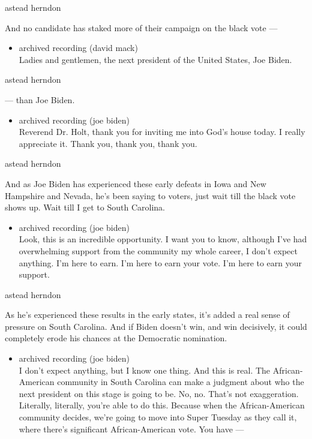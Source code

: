 astead herndon

And no candidate has staked more of their campaign on the black vote ---

\begin{itemize}
\tightlist
\item
  archived recording (david mack)\\
  Ladies and gentlemen, the next president of the United States, Joe
  Biden.
\end{itemize}

astead herndon

--- than Joe Biden.

\begin{itemize}
\tightlist
\item
  archived recording (joe biden)\\
  Reverend Dr. Holt, thank you for inviting me into God's house today. I
  really appreciate it. Thank you, thank you, thank you.
\end{itemize}

astead herndon

And as Joe Biden has experienced these early defeats in Iowa and New
Hampshire and Nevada, he's been saying to voters, just wait till the
black vote shows up. Wait till I get to South Carolina.

\begin{itemize}
\tightlist
\item
  archived recording (joe biden)\\
  Look, this is an incredible opportunity. I want you to know, although
  I've had overwhelming support from the community my whole career, I
  don't expect anything. I'm here to earn. I'm here to earn your vote.
  I'm here to earn your support.
\end{itemize}

astead herndon

As he's experienced these results in the early states, it's added a real
sense of pressure on South Carolina. And if Biden doesn't win, and win
decisively, it could completely erode his chances at the Democratic
nomination.

\begin{itemize}
\tightlist
\item
  archived recording (joe biden)\\
  I don't expect anything, but I know one thing. And this is real. The
  African-American community in South Carolina can make a judgment about
  who the next president on this stage is going to be. No, no. That's
  not exaggeration. Literally, literally, you're able to do this.
  Because when the African-American community decides, we're going to
  move into Super Tuesday as they call it, where there's significant
  African-American vote. You have ---
\end{itemize}

